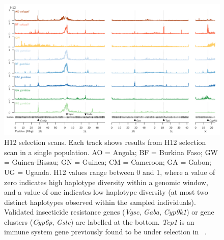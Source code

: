 \begin{refsection}
\begin{figure}[t!]
\centering
\includegraphics[width=1.1\textwidth,center]{artwork/chapter5/h12.png}
\caption{H12 selection scans.
%
Each track shows results from H12 selection scan in a single population.
%
AO = Angola; BF = Burkina Faso; GW = Guinea-Bissau; GN = Guinea; CM = Cameroon; GA = Gabon; UG = Uganda.
%
H12 values range between 0 and 1, where a value of zero indicates high haplotype diversity within a genomic window, and a value of one indicates low haplotype diversity (at most two distinct haplotypes observed within the sampled individuals).
%
Validated insecticide resistance genes (\textit{Vgsc}, \textit{Gaba}, \textit{Cyp9k1}) or gene clusters (\textit{Cyp6p}, \textit{Gste}) are labelled at the bottom.
%
\textit{Tep1} is an immune system gene previously found to be under selection in \acol~\parencite{White2011}.
}
\label{fig:h12}
\end{figure}



\end{refsection}
